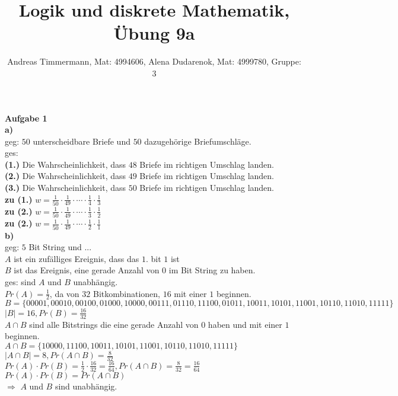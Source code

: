 \documentclass[a4paper]{scrartcl}
\title{Logik und diskrete Mathematik, Übung 9a}
\author{Andreas Timmermann, Mat: 4994606, Alena Dudarenok, Mat: 4999780, Gruppe: 3}
\begin{document}
	\maketitle
	\begin{flushleft}
		\textbf{Aufgabe 1}\\
		\textbf{a)} \\
		geg: $50$ unterscheidbare Briefe und $50$ dazugehörige Briefumschläge.\\
		ges: \\
		\textbf{(1.)} Die Wahrscheinlichkeit, dass $48$ Briefe im richtigen Umschlag landen.\\ 
		\textbf{(2.)} Die Wahrscheinlichkeit, dass $49$ Briefe im richtigen Umschlag landen.\\ 
		\textbf{(3.)} Die Wahrscheinlichkeit, dass $50$ Briefe im richtigen Umschlag landen.\\[1em]
		
		\textbf{zu (1.)} $w=\frac{1}{50}\cdot\frac{1}{49}\cdot\cdots\cdot\frac{1}{4}\cdot\frac{1}{3}$\\
		\textbf{zu (2.)} $w=\frac{1}{50}\cdot\frac{1}{49}\cdot\cdots\cdot\frac{1}{3}\cdot\frac{1}{2}$\\
		\textbf{zu (2.)} $w=\frac{1}{50}\cdot\frac{1}{49}\cdot\cdots\cdot\frac{1}{2}\cdot\frac{1}{1}$\\[1em]

		\textbf{b)} \\
		geg: $5$ Bit String und ...\\
		$A$ ist ein zufälliges Ereignis, dass das $1.$ bit $1$ ist\\
		$B$ ist das Ereignis, eine gerade Anzahl von $0$ im Bit String zu haben.\\[1em]
		ges: sind $A$ und $B$ unabhängig.\\
		$Pr(A)=\frac{1}{2}$, da von $32$ Bitkombinationen, $16$ mit einer $1$ beginnen.\\
		$B=\{00001,00010,00100,01000,10000,00111,01110,11100,01011,10011,10101,11001,10110,11010,11111\}$\\
		$|B| = 16, Pr(B)=\frac{16}{32}$\\
		$A\cap B$ sind alle Bitstrings die eine gerade Anzahl von $0$ haben und mit einer $1$ beginnen.\\
		$A\cap B=\{10000,11100,10011,10101,11001,10110,11010,11111\}$\\
		$|A\cap B|=8, Pr(A\cap B)=\frac{8}{32}$\\[1em]
		$Pr(A)\cdot Pr(B)=\frac{1}{2}\cdot \frac{16}{32}=\frac{16}{64}, Pr(A\cap B) = \frac{8}{32} = \frac{16}{64}$\\
		$Pr(A)\cdot Pr(B) = Pr(A\cap B)$\\[1em]
		$\Rightarrow$ $A$ und $B$ sind unabhängig.\\[1em]
	\end{flushleft}
\end{document}
